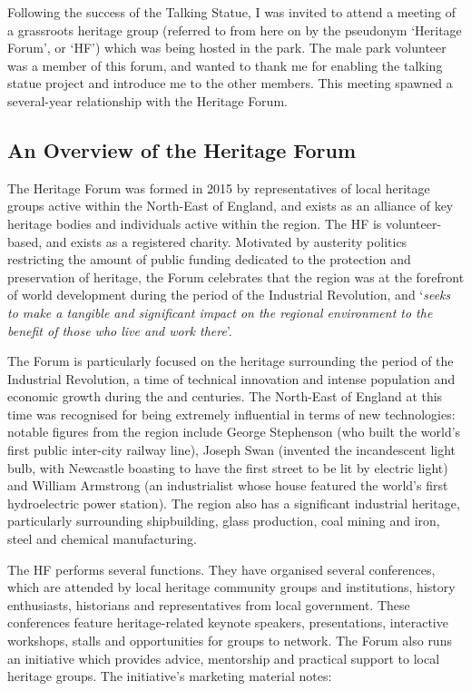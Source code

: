 Following the success of the Talking Statue, I was invited to attend a meeting of a grassroots heritage group (referred to from here on by the pseudonym `Heritage Forum', or `HF') which was being hosted in the park. The male park volunteer was a member of this forum, and wanted to thank me for enabling the talking statue project and introduce me to the other members. This meeting spawned a several-year relationship with the Heritage Forum.

\subsection{An Overview of the Heritage Forum}
The Heritage Forum was formed in 2015 by representatives of local heritage groups active within the North-East of England, and exists as an alliance of key heritage bodies and individuals active within the region. The HF is volunteer-based, and exists as a registered charity. Motivated by austerity politics restricting the amount of public funding dedicated to the protection and preservation of heritage, the Forum celebrates that the region was at the forefront of world development during the period of the Industrial Revolution, and `\textit{seeks to make a tangible and significant impact on the regional environment to the benefit of those who live and work there}'.

The Forum is particularly focused on the heritage surrounding the period of the Industrial Revolution, a time of technical innovation and intense population and economic growth during the  and  centuries. The North-East of England at this time was recognised for being extremely influential in terms of new technologies: notable figures from the region include George Stephenson (who built the world's first public inter-city railway line), Joseph Swan (invented the incandescent light bulb, with Newcastle boasting to have the first street to be lit by electric light) and William Armstrong (an industrialist whose house featured the world's first hydroelectric power station). The region also has a significant industrial heritage, particularly surrounding shipbuilding, glass production, coal mining and iron, steel and chemical manufacturing. 

The HF performs several functions. They have organised several conferences, which are attended by local heritage community groups and institutions, history enthusiasts, historians and representatives from local government. These conferences feature heritage-related keynote speakers, presentations, interactive workshops, stalls and opportunities for groups to network. The Forum also runs an initiative which provides advice, mentorship and practical support to local heritage groups. The initiative's marketing material notes:

